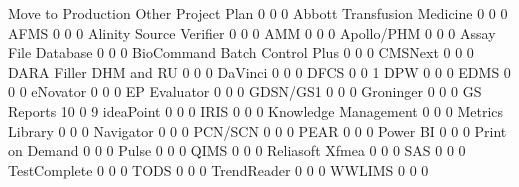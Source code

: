 \documentclass{article}
\begin{document}
\begin{Schunk}
\begin{Soutput}
                                Move to Production Other Project Plan
                                                 0     0            0
  Abbott Transfusion Medicine                    0     0            0
  AFMS                                           0     0            0
  Alinity Source Verifier                        0     0            0
  AMM                                            0     0            0
  Apollo/PHM                                     0     0            0
  Assay File Database                            0     0            0
  BioCommand Batch Control Plus                  0     0            0
  CMSNext                                        0     0            0
  DARA Filler DHM and RU                         0     0            0
  DaVinci                                        0     0            0
  DFCS                                           0     0            1
  DPW                                            0     0            0
  EDMS                                           0     0            0
  eNovator                                       0     0            0
  EP Evaluator                                   0     0            0
  GDSN/GS1                                       0     0            0
  Groninger                                      0     0            0
  GS Reports                                    10     0            9
  ideaPoint                                      0     0            0
  IRIS                                           0     0            0
  Knowledge Management                           0     0            0
  Metrics Library                                0     0            0
  Navigator                                      0     0            0
  PCN/SCN                                        0     0            0
  PEAR                                           0     0            0
  Power BI                                       0     0            0
  Print on Demand                                0     0            0
  Pulse                                          0     0            0
  QIMS                                           0     0            0
  Reliasoft Xfmea                                0     0            0
  SAS                                            0     0            0
  TestComplete                                   0     0            0
  TODS                                           0     0            0
  TrendReader                                    0     0            0
  WWLIMS                                         0     0            0
                               

\end{Soutput}
\end{Schunk}
\end{document}
